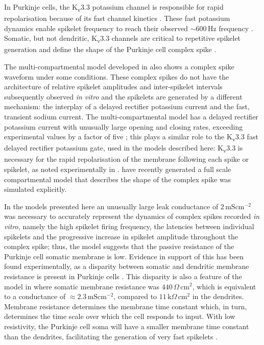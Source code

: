 \documentclass[utf8]{frontiersSCNS} %
\newcommand{\msi}{\,\mathrm{mS cm^{-2}}}
\newcommand{\hz}{\,\mathrm{Hz}}
\begin{document}
In Purkinje cells, the K\textsubscript{v}3.3 potassium channel is
responsible for rapid repolarisation \cite{VeysEtAl2013} because of
its fast channel kinetics
\cite{RudyEtAl1999,RudyMcBain2001}. These fast potassium dynamics
enable spikelet frequency to reach their observed $\sim 600\hz$
frequency \cite{WarnaarEtAl2015,BurroughsEtAl2016}. Somatic, but not
dendritic, K\textsubscript{v}3.3 channels are critical to repetitive
spikelet generation and define the shape of the Purkinje cell complex
spike \cite{HurlockEtAl2008,ZaghaEtAl2008,VeysEtAl2013}.

The multi-compartmental model developed in
\cite{DeSchutterBower1994a,DeSchutterBower1994b,DeSchutterBower1994c}
also shows a complex spike waveform under some conditions. These
complex spikes do not have the architecture of relative spikelet
amplitudes and inter-spikelet intervals subsequently observed
\textit{in vitro} and the spikelets are generated by a different
mechanism: the interplay of a delayed rectifier potassium current and
the fast, transient sodium current. The multi-compartmental model has
a delayed rectifier potassium current with unusually large opening and
closing rates, exceeding experimental values by a factor of five
\cite{YamadaEtAl1989}; this plays a similar role to the
K\textsubscript{v}3.3 fast delayed rectifier potassium gate,
\cite{VeysEtAl2013,ZaghaEtAl2008} used in the models described here:
K\textsubscript{v}3.3 is necessary for the rapid repolarisation of the
membrane following each spike or spikelet, as noted experimentally in
\cite{ZaghaEtAl2008,VeysEtAl2013}. \cite{ZangEtAl2018} have recently
generated a full scale compartmental model that describes the shape of
the complex spike was simulated explicitly.

In the models presented here an unusually large leak conductance of
$2\msi$ was necessary to accurately represent the dynamics of complex
spikes recorded \textit{in vitro}, namely the high spikelet firing
frequency, the latencies between individual spikelets and the
progressive increase in spikelet amplitude throughout the complex
spike; thus, the model suggests that the passive resistance of the
Purkinje cell somatic membrane is low. Evidence in support of this has
been found experimentally, as a disparity between somatic and
dendritic membrane resistance is present in Purkinje cells
\cite{RappEtAl1994}. This disparity is also a feature of the model in
\cite{DeSchutterBower1994a,DeSchutterBower1994b,DeSchutterBower1994c}
where somatic membrane resistance was $440\,\Omega\,\mathrm{cm}^2$,
which is equivalent to a conductance of $\approx 2.3\msi$, compared to
$11\,\mathrm{k}\Omega\,\mathrm{cm}^2$ in the dendrites. Membrane
resistance determines the membrane time constant which, in turn,
determines the time scale over which the cell responds to input. With
low resistivity, the Purkinje cell soma will have a smaller membrane
time constant than the dendrites, facilitating the generation of very
fast spikelets \cite{WarnaarEtAl2015}.
\end{document}
